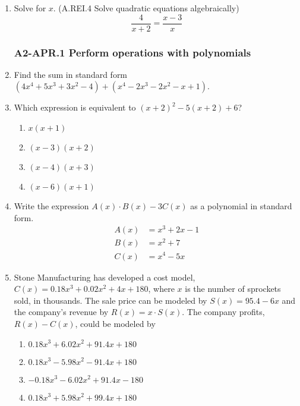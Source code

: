 \documentclass[12pt, twoside]{article}
\begin{document}
\begin{enumerate}[itemsep=0.5cm]
\item Solve for $x$. \hfill (A.REI.4 Solve quadratic equations algebraically)
$$\frac{4}{x+2} = \frac{x-3}{x}$$ \vspace{4cm}

\newpage 
\subsubsection*{A2-APR.1 Perform operations with polynomials}
\item Find the sum in standard form $(4x^4+5x^3+3x^2-4) + (x^4-2x^3-2x^2-x+1)$. \vspace{3cm}

\item Which expression is equivalent to $(x + 2)^2 - 5(x + 2) + 6$?
\begin{enumerate}
    \item $x(x + 1)$
    \item $(x - 3)(x + 2)$
    \item $(x - 4)(x + 3)$
    \item $(x - 6)(x + 1)$
\end{enumerate}

\newpage
\item Write the expression $A(x) \cdot B(x) - 3C(x)$ as a polynomial in standard form. %
\begin{align*}
    A(x) &= x^3 + 2x - 1 \\
    B(x) &= x^2 + 7 \\
    C(x) &= x^4 - 5x
\end{align*}

\item Stone Manufacturing has developed a cost model, $C(x) = 0.18x^3 + 0.02x^2 + 4x + 180$, where $x$ is the number of sprockets sold, in thousands. The sale price can be modeled by $S(x) = 95.4 - 6x$ and the company’s revenue by $R(x) = x \cdot S(x)$. The company profits, $R(x) - C(x)$, could be modeled by %
\begin{enumerate}
    \item $0.18x^3 + 6.02x^2 + 91.4x + 180$
    \item $0.18x^3 - 5.98x^2 - 91.4x + 180$
    \item $-0.18x^3 - 6.02x^2 + 91.4x - 180$
    \item $0.18x^3 + 5.98x^2 + 99.4x + 180$
\end{enumerate}


\end{enumerate}
\end{document}
